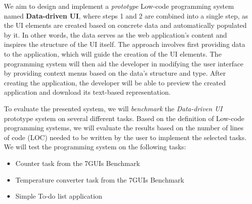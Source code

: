 We aim to design and implement a \emph{prototype} Low-code programming system named \textbf{Data-driven UI}, where steps 1 and 2 are combined into a single step, as the UI elements are created based on concrete data and automatically populated by it.
In other words, the data serves as the web application's content and inspires the structure of the UI itself.
The approach involves first providing data to the application, which will guide the creation of the UI elements.
The programming system will then aid the developer in modifying the user interface by providing context menus based on the data's structure and type.
After creating the application, the developer will be able to preview the created application and download its text-based representation.

To evaluate the presented system, we will \emph{benchmark} the \emph{Data-driven UI} prototype system on several different tasks.
Based on the definition of Low-code programming systems, we will evaluate the results based on the number of lines of code (LOC) needed to be written by the user to implement the selected tasks.
We will test the programming system on the following tasks:
\begin{itemize}
	\item Counter task from the 7GUIs Benchmark
	\item Temperature converter task from the 7GUIs Benchmark
	\item Simple To-do list application
\end{itemize}



\newpage
